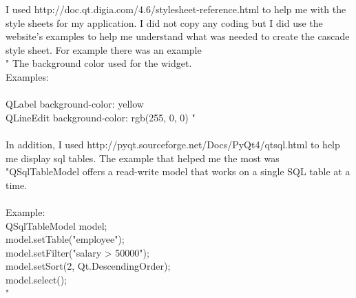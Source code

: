 I used http://doc.qt.digia.com/4.6/stylesheet-reference.html to help me with the style sheets for my application. I did not copy any coding but I did use the website's examples to help me understand what was needed to create the cascade style sheet. For example there was an example \\
" The background color used for the widget. \\
Examples: \\ \\
 QLabel { background-color: yellow } \\
 QLineEdit { background-color: rgb(255, 0, 0) }"
\\ \\
In addition, I used http://pyqt.sourceforge.net/Docs/PyQt4/qtsql.html to help me display sql tables. The example that helped me the most was \\
"QSqlTableModel offers a read-write model that works on a single SQL table at a time. \\
\\
Example:
\\
        QSqlTableModel model; \\
        model.setTable("employee"); \\
        model.setFilter("salary > 50000"); \\
        model.setSort(2, Qt.DescendingOrder); \\
        model.select(); \\
"


